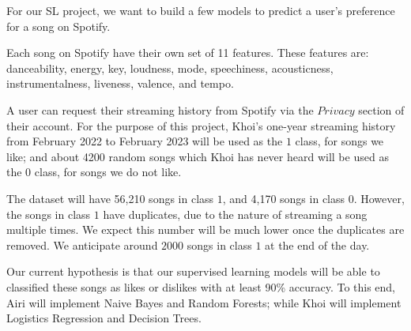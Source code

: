 For our SL project, we want to build a few models to predict a user's preference for a song on Spotify. 

Each song on Spotify have their own set of 11 features. These features are: danceability, energy, key, loudness,
mode, speechiness, acousticness, instrumentalness, liveness, valence, and tempo.

A user can request their streaming history from Spotify via the $Privacy$ section of their account. For the purpose
of this project, Khoi's one-year streaming history from February 2022 to February 2023 will be used as the $1$ class, for songs we like; and about
4200 random songs which Khoi has never heard will be used as the $0$ class, for songs we do not like.

The dataset will have 56,210 songs in class $1$, and 4,170 songs in class $0$. However, the songs in class $1$ have duplicates, due to the nature of streaming
a song multiple times. We expect this number will be much lower once the duplicates are removed. We anticipate around $2000$ songs in class $1$ at the end of the day.

Our current hypothesis is that our supervised learning models will be able to classified these songs as likes or dislikes with at least 90\% accuracy. To this end,
Airi will implement Naive Bayes and Random Forests; while Khoi will implement Logistics Regression and Decision Trees.